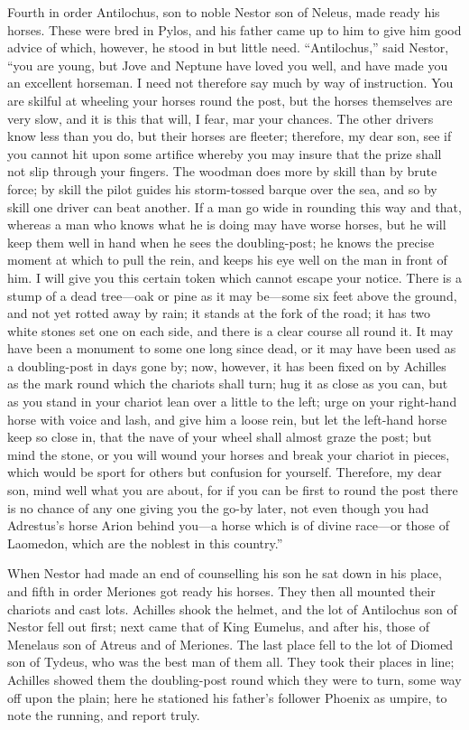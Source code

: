Fourth in order Antilochus, son to noble Nestor son of Neleus, made ready
his horses. These were bred in Pylos, and his father came up to him to
give him good advice of which, however, he stood in but little need.
“Antilochus,” said Nestor, “you are young, but Jove and Neptune have loved
you well, and have made you an excellent horseman. I need not therefore
say much by way of instruction. You are skilful at wheeling your horses
round the post, but the horses themselves are very slow, and it is this
that will, I fear, mar your chances. The other drivers know less than you
do, but their horses are fleeter; therefore, my dear son, see if you
cannot hit upon some artifice whereby you may insure that the prize shall
not slip through your fingers. The woodman does more by skill than by
brute force; by skill the pilot guides his storm-tossed barque over the
sea, and so by skill one driver can beat another. If a man go wide in
rounding this way and that, whereas a man who knows what he is doing may
have worse horses, but he will keep them well in hand when he sees the
doubling-post; he knows the precise moment at which to pull the rein, and
keeps his eye well on the man in front of him. I will give you this
certain token which cannot escape your notice. There is a stump of a dead
tree—oak or pine as it may be—some six feet above the ground,
and not yet rotted away by rain; it stands at the fork of the road; it has
two white stones set one on each side, and there is a clear course all
round it. It may have been a monument to some one long since dead, or it
may have been used as a doubling-post in days gone by; now, however, it
has been fixed on by Achilles as the mark round which the chariots shall
turn; hug it as close as you can, but as you stand in your chariot lean
over a little to the left; urge on your right-hand horse with voice and
lash, and give him a loose rein, but let the left-hand horse keep so close
in, that the nave of your wheel shall almost graze the post; but mind the
stone, or you will wound your horses and break your chariot in pieces,
which would be sport for others but confusion for yourself. Therefore, my
dear son, mind well what you are about, for if you can be first to round
the post there is no chance of any one giving you the go-by later, not
even though you had Adrestus’s horse Arion behind you—a horse which
is of divine race—or those of Laomedon, which are the noblest in
this country.”

When Nestor had made an end of counselling his son he sat down in his
place, and fifth in order Meriones got ready his horses. They then all
mounted their chariots and cast lots. Achilles shook the helmet, and the
lot of Antilochus son of Nestor fell out first; next came that of King
Eumelus, and after his, those of Menelaus son of Atreus and of Meriones.
The last place fell to the lot of Diomed son of Tydeus, who was the best
man of them all. They took their places in line; Achilles showed them the
doubling-post round which they were to turn, some way off upon the plain;
here he stationed his father’s follower Phoenix as umpire, to note the
running, and report truly.

